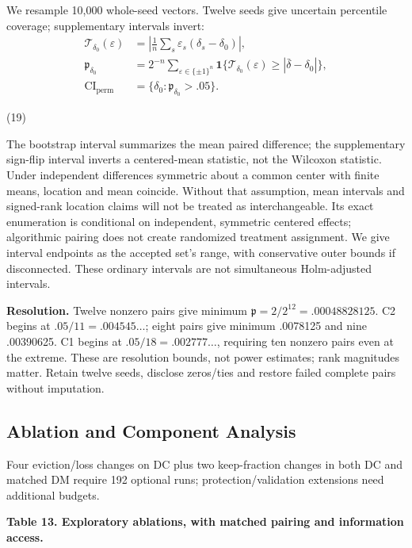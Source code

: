 \documentclass[10pt,a4paper]{article}
\begin{document}
We resample 10,000 whole-seed vectors. Twelve seeds give uncertain percentile coverage; supplementary intervals invert:
\begin{equation}
\begin{aligned}
\mathcal T_{\delta_0}(\varepsilon)&=\left|\frac1n\sum_s\varepsilon_s(\delta_s-\delta_0)\right|,\\
\mathfrak p_{\delta_0}&=2^{-n}\sum_{\varepsilon\in\{\pm1\}^n}
\mathbf1\{\mathcal T_{\delta_0}(\varepsilon)\ge|\bar\delta-\delta_0|\},\\
\mathrm{CI}_{\mathrm{perm}}&=\{\delta_0:\mathfrak p_{\delta_0}>.05\}.
\end{aligned}

\end{equation}
\par\hfill(19)\par

The bootstrap interval summarizes the mean paired difference; the supplementary sign-flip interval inverts a centered-mean statistic, not the Wilcoxon statistic. Under independent differences symmetric about a common center with finite means, location and mean coincide. Without that assumption, mean intervals and signed-rank location claims will not be treated as interchangeable. Its exact enumeration is conditional on independent, symmetric centered effects; algorithmic pairing does not create randomized treatment assignment. We give interval endpoints as the accepted set's range, with conservative outer bounds if disconnected. These ordinary intervals are not simultaneous Holm-adjusted intervals.

\textbf{Resolution.} Twelve nonzero pairs give minimum $\mathfrak p=2/2^{12}=.00048828125$. C2 begins at $.05/11=.004545\ldots$; eight pairs give minimum .0078125 and nine .00390625. C1 begins at $.05/18=.002777\ldots$, requiring ten nonzero pairs even at the extreme. These are resolution bounds, not power estimates; rank magnitudes matter. Retain twelve seeds, disclose zeros/ties and restore failed complete pairs without imputation.

\subsection{Ablation and Component Analysis}
Four eviction/loss changes on DC plus two keep-fraction changes in both DC and matched DM require 192 optional runs; protection/validation extensions need additional budgets.

\centering\footnotesize
\par\textbf{Table 13. Exploratory ablations, with matched pairing and information access.}\par
\end{document}
